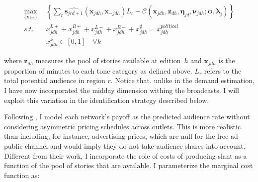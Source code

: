 \documentclass[12pt]{article}
\begin{document}
\begin{equation}\label{eq:payoffs}
	\begin{aligned}
		\max_{\{\mathbf{x}_{jdh}\}}   & \left\{   \sum_{r}\widehat{\bm{s}_{jrd+1}}(\bm{x}_{jdh}, \bm{x}_{-jdh})L_r -  \mathcal{C}\left(  \bm{x}_{jdh},\bm{z}_{dh}, \bm{\eta}_{jd},\bm{\nu}_{jdh}; \bm{\phi},\bm{\lambda_j}   \right)    \right\}\\
		s.t.   \quad &   x_{jdh}^{L+} +x_{jdh}^{R+} + x_{jdh}^{L-} + x_{jdh}^{R-} + x_{jdh}^{\emptyset} = x_{jdh}^{political}\\
		& x_{jdh}^k \in [0,1] \quad \forall k
	\end{aligned}
\end{equation} 



where $\bm z_{dh}$ measures the pool of stories available at edition~$h$ and $\bm x_{jdh}$ is the proportion of minutes to each tone category as defined above. $L_r$  refers to the total potential audience in region $r$. Notice that. unlike in the demand estimation, I have now incorporated the midday dimension withing the broadcasts. I will exploit this variation in the identification strategy described below. 

Following \cite{Goettler2001SpatialCI}, I model each network's payoff as the predicted audience rate without considering asymmetric pricing schedules across outlets. This is more realistic than including, for instance, advertising prices, which are null for the free-ad public channel and would imply they do not take audience shares into account. Different from their work, I incorporate the role of costs of producing slant as a function of the pool of stories that are available. I parameterize the marginal cost function as:

	

	
\end{document}
